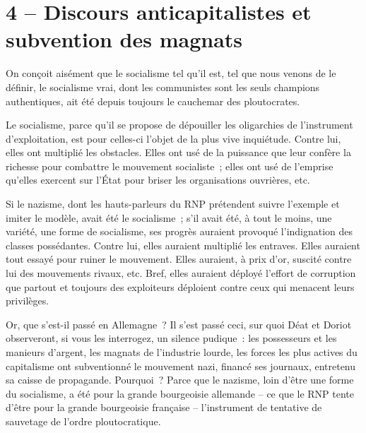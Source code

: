 \documentclass[french,twoside]{book} %
\begin{document}
\section[4 – Discours anticapitalistes et subvention des magnats]{4 – Discours anticapitalistes et subvention des magnats}
\noindent On conçoit aisément que le socialisme tel qu’il est, tel que nous venons de le définir, le socialisme vrai, dont les communistes sont les seuls champions authentiques, ait été depuis toujours le cauchemar des ploutocrates.\par
Le socialisme, parce qu’il se propose de dépouiller les oligarchies de l’instrument d’exploitation, est pour celles-ci l’objet de la plus vive inquiétude. Contre lui, elles ont multiplié les obstacles. Elles ont usé de la puissance que leur confère la richesse pour combattre le mouvement socialiste ; elles ont usé de l’emprise qu’elles exercent sur l’État pour briser les organisations ouvrières, etc.\par
Si le nazisme, dont les hauts-parleurs du RNP prétendent suivre l’exemple et imiter le modèle, avait été le socialisme ; s’il avait été, à tout le moins, une variété, une forme de socialisme, ses progrès auraient provoqué l’indignation des classes possédantes. Contre lui, elles auraient multiplié les entraves. Elles auraient tout essayé pour ruiner le mouvement. Elles auraient, à prix d’or, suscité contre lui des mouvements rivaux, etc. Bref, elles auraient déployé l’effort de corruption que partout et toujours des exploiteurs déploient contre ceux qui menacent leurs privilèges.\par
Or, que s’est-il passé en Allemagne ? Il s’est passé ceci, sur quoi Déat et Doriot observeront, si vous les interrogez, un silence pudique : les possesseurs et les manieurs d’argent, les magnats de l’industrie lourde, les forces les plus actives du capitalisme ont subventionné le mouvement nazi, financé ses journaux, entretenu sa caisse de propagande. Pourquoi ? Parce que le nazisme, loin d’être une forme du socialisme, a été pour la grande bourgeoisie allemande – ce que le RNP tente d’être pour la grande bourgeoisie française – l’instrument de tentative de sauvetage de l’ordre ploutocratique.\par
\end{document}
